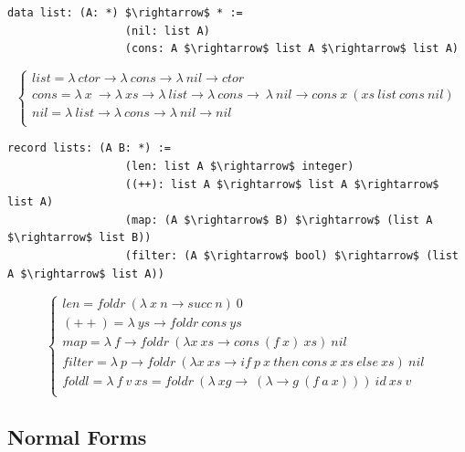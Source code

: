 \documentclass[11pt,oneside]{article}
\begin{document}
\begin{lstlisting}[mathescape=true]
             data list: (A: *) $\rightarrow$ * :=
                  (nil: list A)
                  (cons: A $\rightarrow$ list A $\rightarrow$ list A)
\end{lstlisting}
$$
\begin{cases}
list = \lambda\ ctor \rightarrow \lambda\ cons \rightarrow \lambda\ nil \rightarrow ctor\\
cons = \lambda\ x\ \rightarrow \lambda\ xs \rightarrow \lambda\ list \rightarrow \lambda\ cons \rightarrow\ \lambda\ nil \rightarrow cons\ x\ (xs\ list\ cons\ nil)\\
nil = \lambda\ list \rightarrow \lambda\ cons \rightarrow \lambda\ nil \rightarrow nil\\
\end{cases}
$$
\begin{lstlisting}[mathescape=true]
           record lists: (A B: *) :=
                  (len: list A $\rightarrow$ integer)
                  ((++): list A $\rightarrow$ list A $\rightarrow$ list A)
                  (map: (A $\rightarrow$ B) $\rightarrow$ (list A $\rightarrow$ list B))
                  (filter: (A $\rightarrow$ bool) $\rightarrow$ (list A $\rightarrow$ list A))
\end{lstlisting}
$$
\begin{cases}
len = foldr\ (\lambda\ x\ n \rightarrow succ\ n)\ 0\\
(++) = \lambda\ ys \rightarrow foldr\ cons\ ys\\
map = \lambda\ f \rightarrow foldr\ (\lambda x\ xs \rightarrow cons\ (f\ x)\ xs)\ nil\\
filter = \lambda\ p \rightarrow foldr\ (\lambda x\ xs \rightarrow if\ p\ x\ then\ cons\ x\ xs\ else\ xs)\ nil\\
foldl = \lambda\ f\ v\ xs = foldr\ (\lambda\ xg\rightarrow\ (\lambda \rightarrow g\ (f\ a\ x)))\ id\ xs\ v\\
\end{cases}
$$

\vspace{1cm}
\subsection{Normal Forms}
\end{document}
